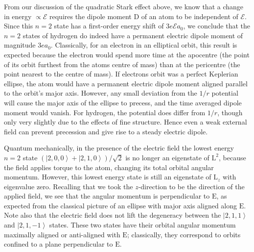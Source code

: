 \documentclass{article}
\theoremstyle{plain}\theoremheaderfont{\normalfont\itshape}\theorembodyfont{\rmfamily}\theoremseparator{.}\newtheorem*{rem}{Remark}\newtheorem*{ex}{Example}\newtheorem*{proof}{Proof}\newtheorem*{altp}{Alternative proof}
\theoremstyle{plain}\theoremheaderfont{\normalfont\bfseries}\theorembodyfont{\rmfamily}\theoremseparator{.}\newtheorem{thm}{Theorem}[section]\newtheorem{lem}[thm]{Lemma}\newtheorem{prop}[thm]{Proposition}\newtheorem*{cor}{Corollary}\newtheorem{defn}[thm]{Definition}\newtheorem{clm}[thm]{Claim}\newtheorem{clminproof}{Claim}
\theoremstyle{break}\theoremheaderfont{\normalfont\itshape}\theorembodyfont{\rmfamily}\theoremseparator{.\medskip}\newtheorem*{proofskip}{Proof}\newtheorem*{exs}{Examples}\newtheorem*{rems}{Remarks}
\theoremstyle{break}\theoremheaderfont{\normalfont\bfseries}\theorembodyfont{\rmfamily}\theoremseparator{.\medskip}\newtheorem{lemskip}[thm]{Lemma}\newtheorem{defnskip}[thm]{Definition}\newtheorem{propskip}[thm]{Proposition}\newtheorem{thmskip}[thm]{Theorem}
\numberwithin{equation}{section}
\newcommand{\ket}[1]{\left| #1 \right\rangle}
\newcommand{\vb}[1]{\bm{\mathrm{#1}}}
\begin{document}
    From our discussion of the quadratic Stark effect above, we know that a change in energy \(\propto\mathcal{E}\) requires the dipole moment \(\vb{D}\) of an atom to be independent of \(\mathcal{E}\). Since this \(n=2\) state has a first-order energy shift of \(3e\mathcal{E}a_0\), we conclude that the \(n=2\) states of hydrogen do indeed have a permanent electric dipole moment of magnitude \(3ea_0\). Classically, for an electron in an elliptical orbit, this result is expected because the electron would spend more time at the apocentre (the point of its orbit furthest from the atoms centre of mass) than at the pericentre (the point nearest to the centre of mass). If electrons orbit was a perfect Keplerian ellipse, the atom would have a permanent electric dipole moment aligned parallel to the orbit's major axis. However, any small deviation from the \(1/r\) potential will cause the major axis of the ellipse to precess, and the time averaged dipole moment would vanish. For hydrogen, the potential does differ from \(1/r\), though only very slightly due to the effects of fine structure. Hence even a weak external field can prevent precession and give rise to a steady electric dipole.

    Quantum mechanically, in the presence of the electric field the lowest energy \(n=2\) state \((\ket{2,0,0}+\ket{2,1,0})/\sqrt{2}\) is no longer an eigenstate of \(\vb{L}^2\), because the field applies torque to the atom, changing its total orbital angular momentum. However, this lowest energy state is still an eigenstate of \(\vb{L}_z\) with eigenvalue zero. Recalling that we took the \(z\)-direction to be the direction of the applied field, we see that the angular momentum is perpendicular to \(\vb{E}\), as expected from the classical picture of an ellipse with major axis aligned along \(\vb{E}\). Note also that the electric field does not lift the degeneracy between the \(\ket{2,1,1}\) and \(\ket{2,1,-1}\) states. These two states have their orbital angular momentum maximally aligned or anti-aligned with \(\vb{E}\); classically, they correspond to orbits confined to a plane perpendicular to \(\vb{E}\).
\end{document}
